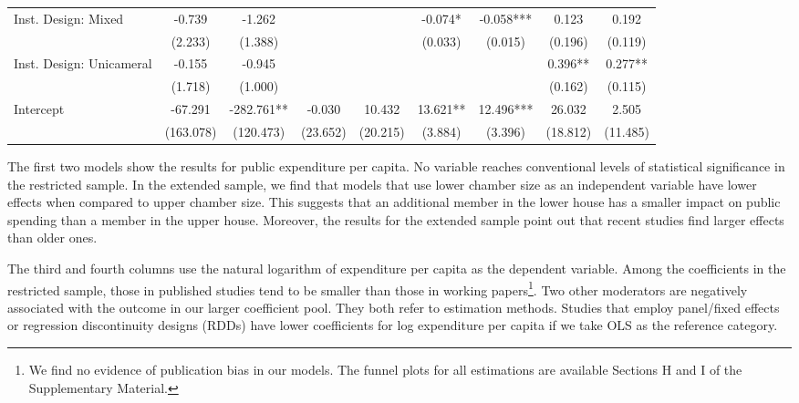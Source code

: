 \documentclass[11pt,a4paper,]{article}
\begin{document}
\begin{table}[htpb]
\begin{tabular}{lcccccccc}
% 
Inst. Design: Mixed & 
-0.739 & -1.262 & 
 &  & 
-0.074* & -0.058*** &
0.123 & 0.192 \\
& (2.233) & (1.388) & 
 &  & 
(0.033) & (0.015) & 
(0.196) & (0.119) \\
% 
Inst. Design: Unicameral & 
-0.155 & -0.945 & 
 &  & 
 &  &
0.396** & 0.277** \\
& (1.718) & (1.000) & 
 &  & 
 &  & 
(0.162) & (0.115) \\
% 
Intercept & 
-67.291 & -282.761** & 
-0.030 & 10.432 & 
13.621** & 12.496*** &
26.032 & 2.505 \\
& (163.078) & (120.473) & 
(23.652) & (20.215) & 
(3.884) & (3.396) & 
(18.812) & (11.485) \\
\bottomrule
\end{tabular}
\begin{minipage}{\textwidth}
\renewcommand{\footnoterule}{}
\end{minipage}
\end{table}

\vspace{0.5cm}

The first two models show the results for public expenditure per capita.
No variable reaches conventional levels of statistical significance in
the restricted sample. In the extended sample, we find that models that
use lower chamber size as an independent variable have lower effects
when compared to upper chamber size. This suggests that an additional
member in the lower house has a smaller impact on public spending than a
member in the upper house. Moreover, the results for the extended sample
point out that recent studies find larger effects than older ones.

The third and fourth columns use the natural logarithm of expenditure
per capita as the dependent variable. Among the coefficients in the
restricted sample, those in published studies tend to be smaller than
those in working
papers\footnote{We find no evidence of publication bias in our models.
The funnel plots for all estimations are available Sections H and I of the
Supplementary Material.}. Two other moderators are negatively associated
with the outcome in our larger coefficient pool. They both refer to
estimation methods. Studies that employ panel/fixed effects or
regression discontinuity designs (RDDs) have lower coefficients for log
expenditure per capita if we take OLS as the reference category.
\end{document}
